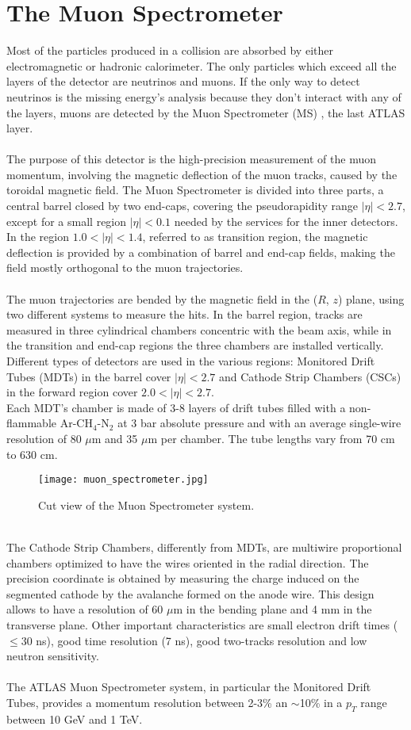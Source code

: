 \section{The Muon Spectrometer}
Most of the particles produced in a collision are absorbed by either electromagnetic or hadronic calorimeter. The only particles which exceed all the layers of the detector are neutrinos and muons. If the only way to detect neutrinos is the missing energy's analysis because they don't interact with any of the layers, muons are detected by the Muon Spectrometer (MS) \cite{CERN-LHCC-97-022}, the last ATLAS layer.
\\\\
The purpose of this detector is the high-precision measurement of the muon momentum, involving the magnetic deflection of the muon tracks, caused by the toroidal magnetic field. The Muon Spectrometer is divided into three parts, a central barrel closed by two end-caps, covering the pseudorapidity range $|\eta| < 2.7$, except for a small region $|\eta| < 0.1$ needed by the services for the inner detectors. In the region $1.0 < |\eta| < 1.4$, referred to as transition region, the magnetic deflection is provided by a combination of barrel and end-cap fields, making the field mostly orthogonal to the muon trajectories.
\\\\
The muon trajectories are bended by the magnetic field in the ($R$, $z$) plane, using two different systems to measure the hits. In the barrel region, tracks are measured in three cylindrical chambers concentric with the beam axis, while in the transition and end-cap regions the three chambers are installed vertically. Different types of detectors are used in the various regions: Monitored Drift Tubes (MDTs) in the barrel cover $|\eta| < 2.7$ and Cathode Strip Chambers (CSCs) in the forward region cover $2.0 < |\eta| < 2.7$.
\\
Each MDT's chamber is made of 3-8 layers of drift tubes filled with a non-flammable Ar-CH$_4$-N$_2$ at 3 bar absolute pressure and with an average single-wire resolution of 80 $\mu$m and 35 $\mu$m per chamber. The tube lengths vary from 70 cm to 630 cm.
\vspace{0.5cm}
\begin{figure}[b!]
\centering
\texttt{[image: muon\_spectrometer.jpg]}
\caption{Cut view of the Muon Spectrometer system.}
\end{figure}
\\The Cathode Strip Chambers, differently from MDTs, are multiwire proportional chambers optimized to have the wires oriented in the radial direction. The precision coordinate is obtained by measuring the charge induced on the segmented cathode by the avalanche formed on the anode wire. This design allows to have a resolution of 60 $\mu$m in the bending plane and 4 mm in the transverse plane. Other important characteristics are small electron drift times ($\leq 30$ ns), good time resolution (7 ns), good two-tracks resolution and low neutron sensitivity.
\\\\
The ATLAS Muon Spectrometer system, in particular the Monitored Drift Tubes, provides a momentum resolution between 2-3\% an $\sim$10\% in a $p_T$ range between 10 GeV and 1 TeV. 